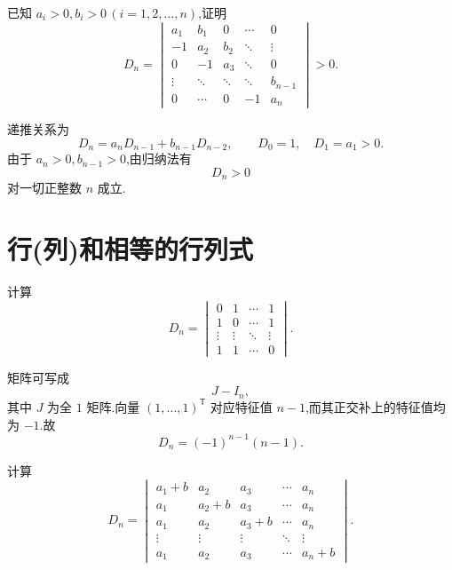 \begin{example}
已知 $a_i>0,b_i>0\,(i=1,2,\ldots,n)$,证明
\[
D_n=
\begin{vmatrix}
a_1 & b_1 & 0 & \cdots & 0\\
-1 & a_2 & b_2 & \ddots & \vdots\\
0 & -1 & a_3 & \ddots & 0\\
\vdots & \ddots & \ddots & \ddots & b_{n-1}\\
0 & \cdots & 0 & -1 & a_n
\end{vmatrix}>0.
\]
\end{example}
\exampleblank

\begin{solution}
递推关系为
\[
D_n=a_nD_{n-1}+b_{n-1}D_{n-2},
\qquad
D_0=1,\quad D_1=a_1>0.
\]
由于 $a_n>0,b_{n-1}>0$,由归纳法有
\[
D_n>0
\]
对一切正整数 $n$ 成立.
\end{solution}


\newpage

\section{行(列)和相等的行列式}

\begin{example}
计算
\[
D_n=
\begin{vmatrix}
0 & 1 & \cdots & 1\\
1 & 0 & \cdots & 1\\
\vdots & \vdots & \ddots & \vdots\\
1 & 1 & \cdots & 0
\end{vmatrix}.
\]
\end{example}
\exampleblank

\begin{solution}
矩阵可写成
\[
J-I_n,
\]
其中 $J$ 为全 $1$ 矩阵.向量 $(1,\ldots,1)^{\mathsf T}$ 对应特征值
$n-1$,而其正交补上的特征值均为 $-1$.故
\[
\boxed{
D_n=(-1)^{n-1}(n-1)
}.
\]
\end{solution}


\begin{example}
计算
\[
D_n=
\begin{vmatrix}
a_1+b & a_2 & a_3 & \cdots & a_n\\
a_1 & a_2+b & a_3 & \cdots & a_n\\
a_1 & a_2 & a_3+b & \cdots & a_n\\
\vdots & \vdots & \vdots & \ddots & \vdots\\
a_1 & a_2 & a_3 & \cdots & a_n+b
\end{vmatrix}.
\]
\end{example}
\exampleblank

